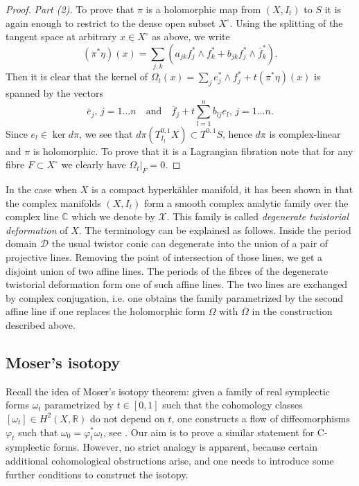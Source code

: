 \documentclass[10pt]{amsart}
\newcommand{\bbR}{\mathbb{R}}
\newcommand{\bbC}{\mathbb{C}}
\newcommand{\DD}{\mathcal{D}}
\newcommand{\XX}{\mathcal{X}}
\newcommand{\dd}{\partial}
\newcommand{\wdg}{\wedge}
\begin{document}
\begin{proof}
{\it Part (2).} To prove that $\pi$ is a holomorphic map from $(X,I_t)$ to $S$ it is
again enough to restrict to the dense open subset $X^\circ$. Using the splitting
of the tangent space at arbitrary $x\in X^\circ$ as above,
we write $$(\pi^*\eta)(x) = \sum_{j,k}( a_{jk} f^*_j\wdg f^*_k + b_{jk} f^*_j\wdg \bar{f}^*_k).$$
Then it is clear that the kernel of $\Omega_t(x) = \sum_j e^*_j\wdg f^*_j + t(\pi^*\eta)(x)$ is spanned by the
vectors
$$
\bar{e}_j, \, j=1\ldots n \quad \mbox{and}\quad \bar{f}_j + t\sum_{l=1}^n b_{lj}e_l, \, j=1\ldots n.
$$
Since $e_l\in \ker{d\pi}$, we see that $d\pi (T^{0,1}_{I_t}X) \subset T^{0,1}S$, hence $d\pi$ is complex-linear and
$\pi$ is holomorphic. To prove that it is a Lagrangian fibration note that for any fibre $F\subset X^\circ$
we clearly have $\Omega_t|_F = 0$.
\end{proof}

In the case when
$X$ is a compact hyperk\"ahler manifold, it has been shown
in \cite{V2} that the complex manifolds $(X,I_t)$
form a smooth complex analytic family over 
the complex line $\bbC$ which we denote by $\XX$.
This family is called {\it degenerate twistorial deformation} of $X$. The terminology
can be explained as follows. Inside the period domain
$\DD$ the usual twistor conic can degenerate into the union
of a pair of projective lines. Removing the point of intersection of those
lines, we get a disjoint union of two affine lines. The periods of the fibres of the
degenerate twistorial deformation form one of such affine lines. 
The two lines are exchanged by complex conjugation,
i.e. one obtains the family parametrized by the second affine line
if one replaces the holomorphic form $\Omega$
with $\overline{\Omega}$ in the construction described above.

\subsection{Moser's isotopy}\label{sec_Moser} Recall the idea of Moser's isotopy theorem:
given a family of real symplectic forms $\omega_t$ parametrized by $t\in[0,1]$ 
such that the cohomology classes $[\omega_t]\in H^2(X,\bbR)$ do not depend on $t$, one constructs
a flow of diffeomorphisms $\varphi_t$ such that $\omega_0 = \varphi_t^*\omega_t$,
see \cite[Theorem 2]{Mo}.
Our aim is to prove a similar statement for C-symplectic forms.
However, no strict analogy is apparent, because certain additional
cohomological obstructions arise, and one needs to introduce some
further conditions to construct the isotopy.
\end{document}
